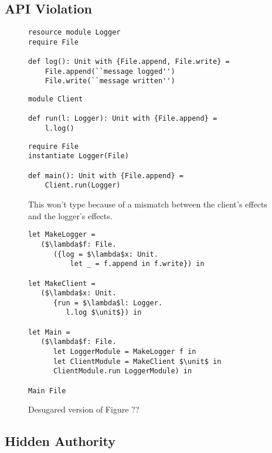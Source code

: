\subsection{API Violation}


\begin{figure}[h]

\begin{lstlisting}
resource module Logger
require File

def log(): Unit with {File.append, File.write} =
    File.append(``message logged'')
    File.write(``message written'')
\end{lstlisting}

\begin{lstlisting}
module Client

def run(l: Logger): Unit with {File.append} =
    l.log()
\end{lstlisting}

\begin{lstlisting}
require File
instantiate Logger(File)

def main(): Unit with {File.append} =
    Client.run(Logger)
\end{lstlisting}

\caption{This won't type because of a mismatch between the client's effects and the logger's effects.}
\label{This is the label.}
\end{figure}


\begin{figure}[h]

\begin{lstlisting}
let MakeLogger =
   ($\lambda$f: File.
      ({log = $\lambda$x: Unit.
          let _ = f.append in f.write}) in
           
let MakeClient =
   ($\lambda$x: Unit.
      {run = $\lambda$l: Logger.
         l.log $\unit$}) in
         
let Main =
   ($\lambda$f: File.
      let LoggerModule = MakeLogger f in
      let ClientModule = MakeClient $\unit$ in
      ClientModule.run LoggerModule) in

Main File
\end{lstlisting}

\caption{Desugared version of Figure ??}
\label{This is the label.}
\end{figure}


\subsection{Hidden Authority}

